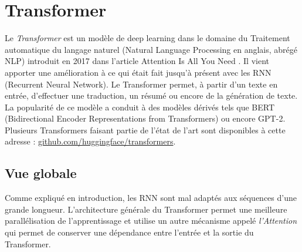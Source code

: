\newpage


\section{Transformer}

Le \textit{Transformer} est un modèle de deep learning dans le domaine du Traitement automatique du langage naturel (Natural Language Processing en anglais, abrégé NLP)
introduit en 2017 dans l'article \og Attention Is All You Need \fg{}\cite{vaswani2017attention}.
Il vient apporter une amélioration à ce qui était fait jusqu'à présent avec les RNN (Recurrent Neural Network).
Le Transformer permet, à partir d'un texte en entrée, d'effectuer une traduction, un résumé ou encore de la génération de texte. \\

La popularité de ce modèle a conduit à des modèles dérivés tels que
BERT (Bidirectional Encoder Representations from Transformers)\cite{devlin2018bert} ou encore GPT-2\cite{radford2019gpt2}.
Plusieurs Transformers faisant partie de l'état de l'art sont disponibles à cette adresse : \href{https://github.com/huggingface/transformers}{github.com/huggingface/transformers}.

\subsection{Vue globale}

Comme expliqué en introduction, les RNN sont mal adaptés aux séquences d'une grande longueur.
L'architecture générale du Transformer permet une meilleure parallélisation de l'apprentissage et utilise un autre mécanisme appelé \textit{l'Attention} qui permet
de conserver une dépendance entre l'entrée et la sortie du Transformer.

